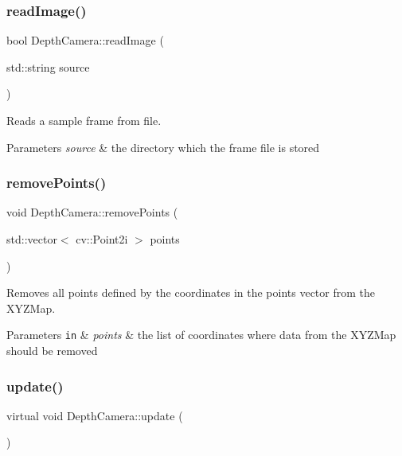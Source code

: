 \subsubsection{\texorpdfstring{read\+Image()}{readImage()}}
{\footnotesize\ttfamily bool Depth\+Camera\+::read\+Image (\begin{DoxyParamCaption}\item[{std\+::string}]{source }\end{DoxyParamCaption})}



Reads a sample frame from file. 


\begin{DoxyParams}{Parameters}
{\em source} & the directory which the frame file is stored \\
\hline
\end{DoxyParams}
\hypertarget{class_depth_camera_a8f38ced63dcfb0c4c56cb7d4e940bcd8}{}\label{class_depth_camera_a8f38ced63dcfb0c4c56cb7d4e940bcd8} 
\subsubsection{\texorpdfstring{remove\+Points()}{removePoints()}}
{\footnotesize\ttfamily void Depth\+Camera\+::remove\+Points (\begin{DoxyParamCaption}\item[{std\+::vector$<$ cv\+::\+Point2i $>$}]{points }\end{DoxyParamCaption})}



Removes all points defined by the coordinates in the points vector from the X\+Y\+Z\+Map. 


\begin{DoxyParams}[1]{Parameters}
\mbox{\tt in}  & {\em points} & the list of coordinates where data from the X\+Y\+Z\+Map should be removed \\
\hline
\end{DoxyParams}
\hypertarget{class_depth_camera_abae1b9f37a00b17f00ff983ebb43ffc5}{}\label{class_depth_camera_abae1b9f37a00b17f00ff983ebb43ffc5} 
\subsubsection{\texorpdfstring{update()}{update()}}
{\footnotesize\ttfamily virtual void Depth\+Camera\+::update (\begin{DoxyParamCaption}{ }\end{DoxyParamCaption})\hspace{0.3cm}{\ttfamily [pure virtual]}}




